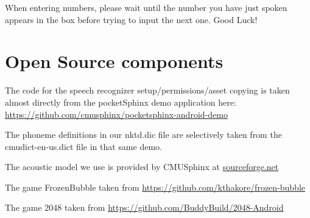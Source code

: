 \documentclass[11pt, oneside]{article}
\begin{document}
When entering numbers, please wait until the number you have just spoken appears
in the box before trying to input the next one.
Good Luck!

\section{Open Source components}

The code for the speech recognizer setup/permissions/asset copying is
taken almost directly from the pocketSphinx demo application here:
\url{https://github.com/cmusphinx/pocketsphinx-android-demo}

The phoneme definitions in our nktd.dic file are selectively taken
from the cmudict-en-us.dict file in that same demo.

The acoustic model we use is provided by CMUSphinx at
\href{https://sourceforge.net/projects/cmusphinx/files/Acoustic\%20and\%20Language\%20Models/US\%20English/}{sourceforge.net}

The game FrozenBubble taken from
\url{https://github.com/kthakore/frozen-bubble}

The game 2048 taken from
\url{https://github.com/BuddyBuild/2048-Android}
    
\end{document}
